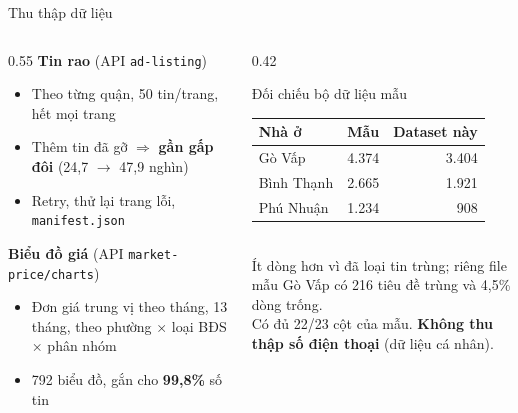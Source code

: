 \documentclass[aspectratio=169,11pt]{beamer}
\newcommand{\num}[1]{{\color{accentdark}\bfseries #1}}
\newcommand{\ghichu}[1]{{\color{muted}\footnotesize #1}}
\begin{document}
\begin{frame}{Thu thập dữ liệu}
  \begin{columns}[T]
    \begin{column}{0.55\linewidth}
      \small
      \textbf{Tin rao} \ghichu{(API \texttt{ad-listing})}
      \begin{itemize}
        \item Theo từng quận, 50 tin/trang, hết mọi trang
        \item Thêm tin đã gỡ $\Rightarrow$ \num{gần gấp đôi} (24,7 $\to$ 47,9 nghìn)
        \item Retry, thử lại trang lỗi, \texttt{manifest.json}
      \end{itemize}
      \vspace{0.5em}
      \textbf{Biểu đồ giá} \ghichu{(API \texttt{market-price/charts})}
      \begin{itemize}
        \item Đơn giá trung vị theo tháng, 13 tháng, theo phường × loại BĐS × phân nhóm
        \item 792 biểu đồ, gắn cho \num{99,8\%} số tin
      \end{itemize}
    \end{column}
    \begin{column}{0.42\linewidth}
      \begin{block}{Đối chiếu bộ dữ liệu mẫu}
        \small
        \begin{tabular}{@{}lrr@{}}
          Nhà ở & Mẫu & Dataset này \\ \midrule
          Gò Vấp & 4.374 & 3.404 \\
          Bình Thạnh & 2.665 & 1.921 \\
          Phú Nhuận & 1.234 & 908 \\
        \end{tabular}\\[0.4em]
        \footnotesize Ít dòng hơn vì đã loại tin trùng; riêng file mẫu Gò Vấp có 216 tiêu đề trùng và 4,5\% dòng trống.\\[0.3em]
        Có đủ 22/23 cột của mẫu. \textbf{Không thu thập số điện thoại} (dữ liệu cá nhân).
      \end{block}
    \end{column}
  \end{columns}
\end{frame}
\end{document}
